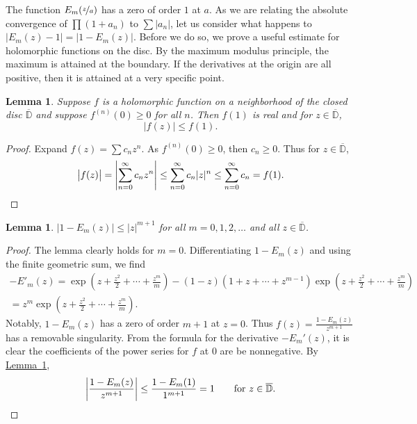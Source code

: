 \documentclass[12pt,openany]{book}
\newcommand{\sabs}[1]{\lvert {#1} \rvert}
\newcommand{\babs}[1]{\bigl\lvert {#1} \bigr\rvert}
\newcommand{\abs}[1]{\left\lvert {#1} \right\rvert}
\newcommand{\D}{{\mathbb{D}}}
\theoremstyle{plain}
\newtheorem{lemma}[thm]{Lemma}
\theoremstyle{remark}
\theoremstyle{definition}
\theoremstyle{exercise}
\theoremstyle{example}
\newcommand{\lemmaref}[1]{\hyperref[#1]{Lemma~\ref*{#1}}}
\begin{document}
The function $E_m(\nicefrac{z}{a})$ has a zero of order $1$ at $a$.
As we are relating the absolute convergence of $\prod (1+a_n)$ to $\sum
\sabs{a_n}$, let us consider what happens to $\babs{E_m(z)-1}=\babs{1-E_m(z)}$.
Before we do so, we prove a useful estimate for holomorphic functions
on the disc.
By the maximum modulus principle, the maximum is attained at the boundary.
If the derivatives at the origin are all positive, then it is attained
at a very specific point.

\begin{lemma} \label{lemma:maxprincpositive}
Suppose $f$ is a holomorphic function on a neighborhood of the closed
disc $\overline{\D}$ and suppose $f^{(n)}(0) \geq 0$ for all $n$.
Then $f(1)$ is real and for $z \in \overline{\D}$,
\begin{equation*}
\babs{f(z)} \leq f(1) .
\end{equation*}
\end{lemma}

\begin{proof}
Expand $f(z) = \sum c_n z^n$.  As $f^{(n)}(0) \geq 0$,
then $c_n \geq 0$.
Thus for $z \in \overline{\D}$,
\begin{equation*}
\babs{f(z)} =
\abs{\sum_{n=0}^\infty c_n z^n}
\leq
\sum_{n=0}^\infty c_n \sabs{z}^n
\leq
\sum_{n=0}^\infty c_n = f(1) .  \qedhere
\end{equation*}
\end{proof}

\begin{lemma} \label{lemma:elemfactbound}
$\sabs{1-E_m(z)} \leq \sabs{z}^{m+1}$ for all $m = 0,1,2,\ldots$ and all 
$z \in \overline{\D}$.
\end{lemma}

\begin{proof}
The lemma clearly holds for $m=0$.
Differentiating $1-E_m(z)$ and using the finite geometric sum, we find
\begin{multline*}
-E'_m(z) =
\exp\left( z +\frac{z^2}{2} + \cdots + \frac{z^m}{m} \right)
-
(1-z) (1 +z  + \cdots + z^{m-1} ) \exp\left( z +\frac{z^2}{2} + \cdots + \frac{z^m}{m} \right)
\\
=
z^m \exp\left( z +\frac{z^2}{2} + \cdots + \frac{z^m}{m} \right) .
\end{multline*}
Notably, $1-E_m(z)$ has a zero of order $m+1$ at $z=0$.  Thus $f(z) =
\frac{1-E_m(z)}{z^{m+1}}$ has a removable singularity.  From the formula for
the derivative $-E_m'(z)$, it is clear the coefficients of the power series
for $f$ at $0$ are be nonnegative.  By \lemmaref{lemma:maxprincpositive},
\begin{equation*}
\abs{\frac{1-E_m(z)}{z^{m+1}}} \leq
\frac{1-E_m(1)}{1^{m+1}} = 1
\qquad \text{for $z \in \overline{\D}$}.  \qedhere
\end{equation*}
\end{proof}
\end{document}
